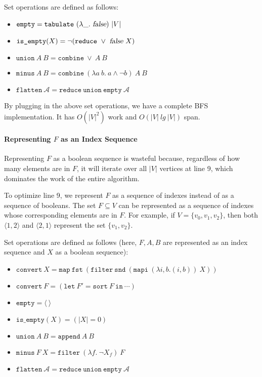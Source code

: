 \documentclass[11pt,a4paper,oneside,microtype,nokorean]{oblivoir}
\newcommand{\kwfalse}{\textsl{false}}
\begin{document}
Set operations are defined as follows:

\begin{itemize}
\item $\texttt{empty} = \texttt{tabulate}~(\lambda \_.~\kwfalse)~|V|$
\item $\texttt{is\_empty}(X) = \neg (\texttt{reduce}~\lor~\kwfalse~X)$
\item $\texttt{union}~A~B = \texttt{combine}~\lor~A~B$
\item $\texttt{minus}~A~B = \texttt{combine}~(\lambda a~b.~a \land \neg b)~A~B$
\item $\texttt{flatten}~\mathcal{A} = \texttt{reduce}~\texttt{union}~\texttt{empty}~\mathcal{A}$
\end{itemize}

By plugging in the above set operations, we have a complete BFS implementation.  It has $O(|V|^2)$
work and $O(|V|~lg~|V|)$ span.


\paragraph{Representing $F$ as an Index Sequence}

Representing $F$ as a boolean sequence is wasteful because, regardless of how many elements are in
$F$, it will iterate over all $|V|$ vertices at line 9, which dominates the work of the entire
algorithm.

To optimize line 9, we represent $F$ as a sequence of indexes instead of as a sequence of booleans.
The set $F \subseteq V$ can be represented as a sequence of indexes whose corresponding elements are
in $F$.  For example, if $V = \{v_0,v_1,v_2\}$, then both $\langle 1,2 \rangle$ and
$\langle 2,1 \rangle$ represent the set $\{v_1,v_2\}$.

Set operations are defined as follows (here, $F,A,B$ are represented as an index sequence and $X$ as
a boolean sequence):

\begin{itemize}
\item $\texttt{convert}~X = \texttt{map}~\texttt{fst}~(\texttt{filter}~\texttt{snd}~(\texttt{mapi}~(\lambda i,b. (i,b))~X))$
\item $\texttt{convert}~F = (\texttt{let}~F' = \texttt{sort}~F~\texttt{in}~\cdots)$
\item $\texttt{empty} = \langle~\rangle$
\item $\texttt{is\_empty}(X) = (|X| = 0)$
\item $\texttt{union}~A~B = \texttt{append}~A~B$
\item $\texttt{minus}~F~X = \texttt{filter}~(\lambda f.~\neg X_f)~F$
\item $\texttt{flatten}~\mathcal{A} = \texttt{reduce}~\texttt{union}~\texttt{empty}~\mathcal{A}$
\end{itemize}
\end{document}
